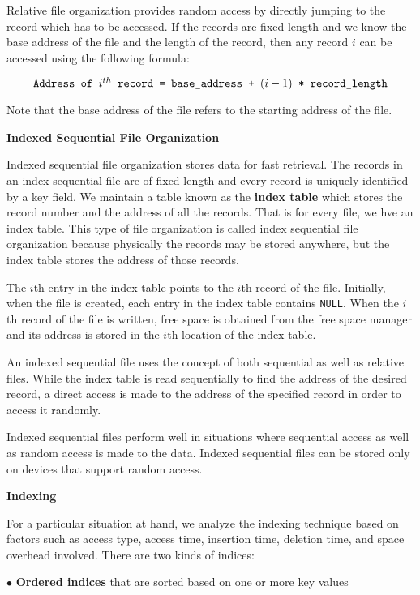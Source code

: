 \vskip 1mm
Relative file organization provides random access by directly jumping to the record which has to be accessed. If the records are fixed length and we know the base address of the file and the length of the record, then any record $i$ can be accessed using the following formula:

$$\hbox{\tt Address of $i^{th}$\ record = base$\_$address + $(i-1)$ * record$\_$length}$$

Note that the base address of the file refers to the starting address of the file.

\filbreak
\vskip 1cm
{\bf Indexed Sequential File Organization}

\vskip 1mm
Indexed sequential file organization stores data for fast retrieval. The records in an index sequential file are of fixed length and every record is uniquely identified by a key field. We maintain a table known as the {\bf index table} which stores the record number and the address of all the records. That is for every file, we hve an index table. This type of file organization is called index sequential file organization because physically the records may be stored anywhere, but the index table stores the address of those records.

\vskip 1mm
The $i$th entry in the index table points to the $i$th record of the file. Initially, when the file is created, each entry in the index table contains {\tt NULL}. When the $i$th record of the file is written, free space is obtained from the free space manager and its address is stored in the $i$th location of the index table.

\vskip 1mm
An indexed sequential file uses the concept of both sequential as well as relative files. While the index table is read sequentially to find the address of the desired record, a direct access is made to the address of the specified record in order to access it randomly.

\vskip 1mm
Indexed sequential files perform well in situations where sequential access as well as random access is made to the data. Indexed sequential files can be stored only on devices that support random access.

\filbreak
\vskip 1cm
{\bf Indexing}

\vskip 1mm
For a particular situation at hand, we analyze the indexing technique based on factors such as access type, access time, insertion time, deletion time, and space overhead involved. There are two kinds of indices:

\vskip 3mm
\qquad$\bullet$ {\bf Ordered indices} that are sorted based on one or more key values

